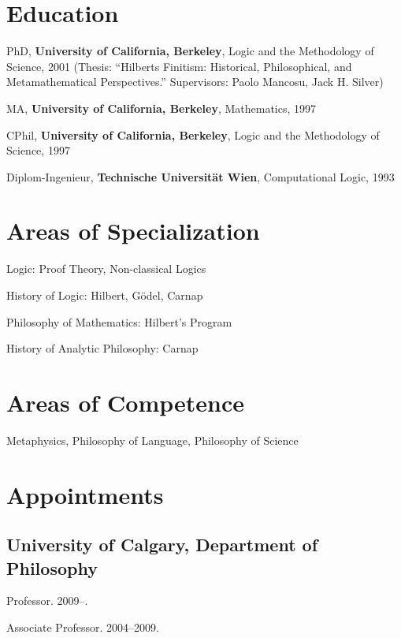 \documentclass[11pt]{article}
\title{}
\def\printdate#1{\xprintdate#1-}
\def\xprintdate#1-#2-#3-{#1}
\def\daterange#1#2{\xprintdate#1---\xprintdate#2-}
\begin{document}
\maketitle

\section{Education}

\ind PhD, \textbf{University of California, Berkeley}, Logic and the Methodology of Science, \printdate{2001-05-01} (Thesis: ``Hilberts Finitism: Historical, Philosophical, and
Metamathematical Perspectives.'' Supervisors: Paolo Mancosu, Jack H.
Silver)

\ind MA, \textbf{University of California, Berkeley}, Mathematics, \printdate{1997-05-01}

\ind CPhil, \textbf{University of California, Berkeley}, Logic and the Methodology of Science, \printdate{1997-05-01}

\ind Diplom-Ingenieur, \textbf{Technische Universität Wien}, Computational Logic, \printdate{1993-11-01}


\section{Areas of Specialization}
\ind Logic: Proof Theory, Non-classical Logics

\ind History of Logic: Hilbert, Gödel, Carnap

\ind Philosophy of Mathematics: Hilbert's Program

\ind History of Analytic Philosophy: Carnap


\section{Areas of Competence}
\ind Metaphysics, Philosophy of Language, Philosophy of Science



\section{Appointments}

\subsection{University of Calgary, Department of Philosophy}
\ind Professor. \printdate{2009-07-01}--.

\ind Associate Professor. \daterange{2004-07-01}{2009-06-30}.
\end{document}
